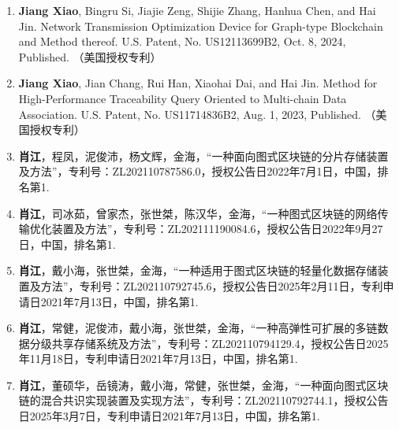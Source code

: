    \begin{enumerate}[itemsep=0pt, topsep=0pt, parsep=0pt]
        \item \textbf{Jiang Xiao}, Bingru Si, Jiajie Zeng, Shijie Zhang, Hanhua Chen, and Hai Jin. Network Transmission Optimization Device for Graph-type Blockchain and Method thereof. U.S. Patent, No. US12113699B2, Oct. 8, 2024, Published. （美国授权专利）

        \item \textbf{Jiang Xiao}, Jian Chang, Rui Han, Xiaohai Dai, and Hai Jin. Method for High-Performance Traceability Query Oriented to Multi-chain Data Association. U.S. Patent, No. US11714836B2, Aug. 1, 2023, Published. （美国授权专利）

        \item \textbf{肖江}，程凤，泥俊沛，杨文辉，金海，“一种面向图式区块链的分片存储装置及方法”，专利号：ZL202110787586.0，授权公告日2022年7月1日，中国，排名第1.

        \item \textbf{肖江}，司冰茹，曾家杰，张世桀，陈汉华，金海，“一种图式区块链的网络传输优化装置及方法”，专利号：ZL202111190084.6，授权公告日2022年9月27日，中国，排名第1.

        \item \textbf{肖江}，戴小海，张世桀，金海，“一种适用于图式区块链的轻量化数据存储装置及方法”，专利号：ZL202110792745.6，授权公告日2025年2月11日，专利申请日2021年7月13日，中国，排名第1.

        \item \textbf{肖江}，常健，泥俊沛，戴小海，张世桀，金海，“一种高弹性可扩展的多链数据分级共享存储系统及方法”，专利号：ZL202110794129.4，授权公告日2025年11月18日，专利申请日2021年7月13日，中国，排名第1.

        \item \textbf{肖江}，董硕华，岳镜涛，戴小海，常健，张世桀，金海，“一种面向图式区块链的混合共识实现装置及实现方法”，专利号：ZL202110792744.1，授权公告日2025年3月7日，专利申请日2021年7月13日，中国，排名第1.
    \end{enumerate}

{\kaishu

}